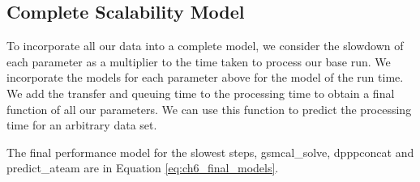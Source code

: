 \subsection{Complete Scalability Model}
To incorporate all our data into a complete model, we consider the slowdown of each parameter as a multiplier to the time taken to process our base run. We incorporate the models for each parameter above for the model of the run time. We add the transfer and queuing time to the processing time to obtain a final function of all our parameters. We can use this function to predict the processing time for an arbitrary data set. 

The final performance model for the slowest steps, {\selectfont gsmcal\_solve}, {\selectfont dpppconcat}  and {\selectfont predict\_ateam} are in Equation \ref{eq:ch6_final_models}. 

